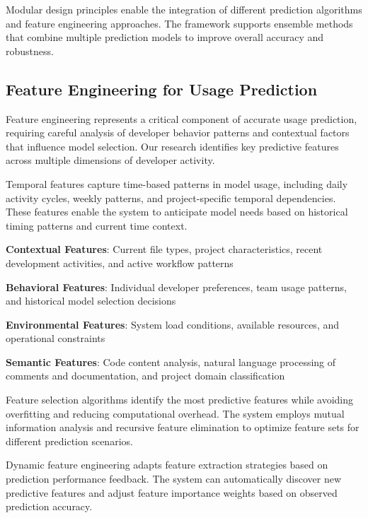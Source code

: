Modular design principles enable the integration of different prediction algorithms and feature engineering approaches. The framework supports ensemble methods that combine multiple prediction models to improve overall accuracy and robustness.

\subsection*{Feature Engineering for Usage Prediction}

Feature engineering represents a critical component of accurate usage prediction, requiring careful analysis of developer behavior patterns and contextual factors that influence model selection. Our research identifies key predictive features across multiple dimensions of developer activity.

Temporal features capture time-based patterns in model usage, including daily activity cycles, weekly patterns, and project-specific temporal dependencies. These features enable the system to anticipate model needs based on historical timing patterns and current time context.

\begin{expandedlist}
    \item \textbf{Contextual Features}: Current file types, project characteristics, recent development activities, and active workflow patterns
    \item \textbf{Behavioral Features}: Individual developer preferences, team usage patterns, and historical model selection decisions
    \item \textbf{Environmental Features}: System load conditions, available resources, and operational constraints
    \item \textbf{Semantic Features}: Code content analysis, natural language processing of comments and documentation, and project domain classification
\end{expandedlist}

Feature selection algorithms identify the most predictive features while avoiding overfitting and reducing computational overhead. The system employs mutual information analysis and recursive feature elimination to optimize feature sets for different prediction scenarios.

Dynamic feature engineering adapts feature extraction strategies based on prediction performance feedback. The system can automatically discover new predictive features and adjust feature importance weights based on observed prediction accuracy.

